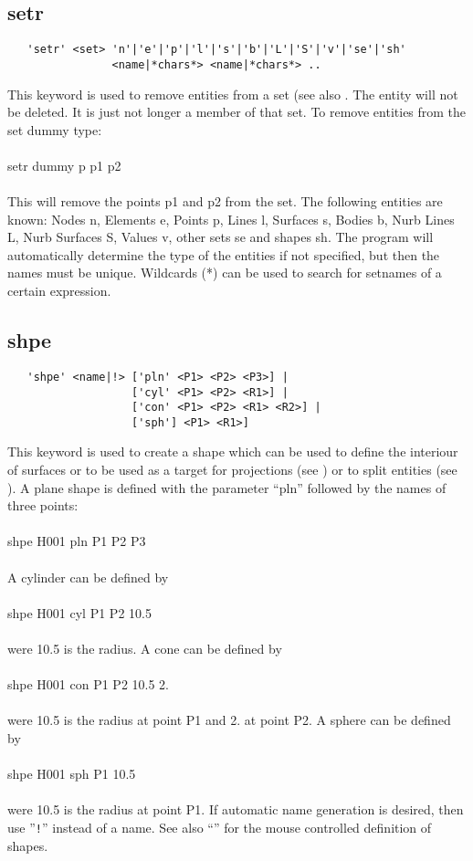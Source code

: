 \documentclass{article}
\begin{document}
\subsection{\label{setr}setr}
\begin{verbatim}
   'setr' <set> 'n'|'e'|'p'|'l'|'s'|'b'|'L'|'S'|'v'|'se'|'sh'
                <name|*chars*> <name|*chars*> .. 
\end{verbatim}
This keyword is used to remove entities from a set (see also . The entity will not be deleted. It is just not longer a member of that set. To remove entities from the set dummy type:\\\\setr dummy p p1 p2\\\\This will remove the points p1 and p2 from the set. The following entities are known: Nodes n, Elements e, Points p, Lines l, Surfaces s, Bodies b, Nurb Lines L, Nurb Surfaces S, Values v, other sets se and shapes sh. The program will automatically determine the type of the entities if not specified, but then the names must be unique. Wildcards (*) can be used to search for setnames of a certain expression.

\subsection{\label{shpe}shpe}
\begin{verbatim}
   'shpe' <name|!> ['pln' <P1> <P2> <P3>] |
                   ['cyl' <P1> <P2> <R1>] |
                   ['con' <P1> <P2> <R1> <R2>] |
                   ['sph'] <P1> <R1>]
\end{verbatim}
This keyword is used to create a shape which can be used to define the interiour of surfaces or to be used as a target for projections (see ) or to split entities (see ). A plane shape is defined with the parameter ``pln'' followed by the names of three points:\\\\shpe H001 pln P1 P2 P3\\\\A cylinder can be defined by\\\\shpe H001 cyl P1 P2 10.5\\\\were 10.5 is the radius. A cone can be defined by\\\\shpe H001 con P1 P2 10.5 2.\\\\were 10.5 is the radius at point P1 and 2. at point P2. A sphere can be defined by\\\\shpe H001 sph P1 10.5\\\\were 10.5 is the radius at point P1. If automatic name generation is desired, then use ''\verb_!_'' instead of a name. See also ``'' for the mouse controlled definition of shapes.
\end{document}

